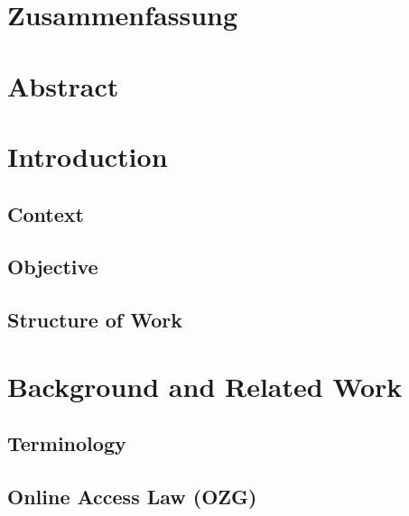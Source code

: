 \documentclass[
     12pt,         %
     a4paper,      %
     BCOR=10mm,version=first,     %
     DIV=14,version=first,        %
     ]{scrreprt}
\begin{document}
\chapter*{Zusammenfassung}

\newpage

\chapter*{Abstract}

\newpage

\tableofcontents
\cleardoublepage
{}

\chapter{Introduction}

\section{Context}



\section{Objective}



\section{Structure of Work}



\chapter{Background and Related Work}

\section{Terminology}



\section{Online Access Law (OZG)}


\end{document}
